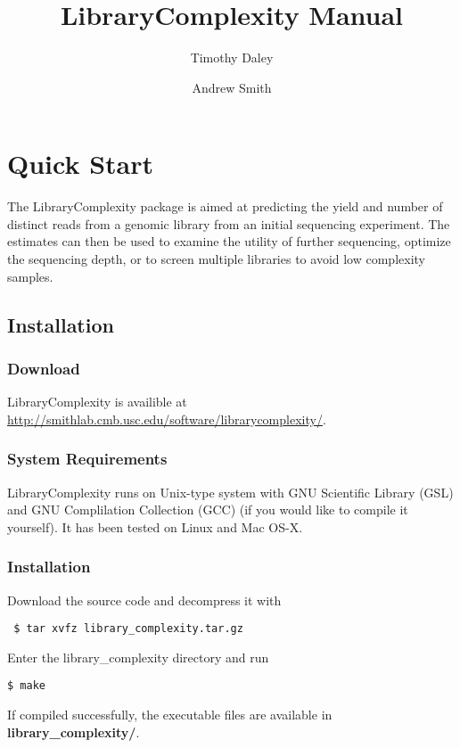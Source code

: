 \documentclass[11pt]{report}
\title{LibraryComplexity Manual}
\author{Timothy Daley \and Andrew Smith}
\begin{document}
\maketitle

\chapter{Quick Start}
\label{chap:quickstart}

The LibraryComplexity package is aimed at predicting
the yield and number of distinct reads from a genomic library
from an initial sequencing experiment.  The estimates
can then be used to examine the utility of further
sequencing, optimize the sequencing depth,
or to screen multiple libraries to avoid low complexity
samples.

\section{Installation}
\label{sec:install}

\subsection*{Download}

LibraryComplexity is availible at
\url{http://smithlab.cmb.usc.edu/software/librarycomplexity/}.

\subsection*{System Requirements}

LibraryComplexity runs on Unix-type system
with GNU Scientific Library (GSL) and
GNU Complilation Collection (GCC) (if you would like to compile it
yourself).  It has been tested on Linux and 
Mac OS-X.

\subsection*{Installation}

Download the source code and decompress
it with 
\begin{verbatim}
 $ tar xvfz library_complexity.tar.gz
\end{verbatim}
% 
Enter the library\_complexity directory and run
\begin{verbatim}
$ make
\end{verbatim}
If compiled successfully, the executable files are available
in \textbf{library\_complexity/}.
\end{document}
